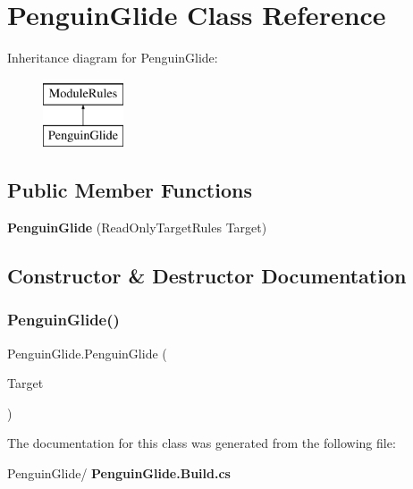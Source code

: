 \section{Penguin\+Glide Class Reference}
\label{class_penguin_glide}
Inheritance diagram for Penguin\+Glide\+:\begin{figure}[H]
\begin{center}
\leavevmode
\includegraphics[height=2.000000cm]{class_penguin_glide}
\end{center}
\end{figure}
\subsection*{Public Member Functions}
\begin{DoxyCompactItemize}
\item 
\textbf{ Penguin\+Glide} (Read\+Only\+Target\+Rules Target)
\end{DoxyCompactItemize}


\subsection{Constructor \& Destructor Documentation}
\mbox{\label{class_penguin_glide_a44f1572327c1e97de8a2cee86e356002}} 
\subsubsection{PenguinGlide()}
{\footnotesize\ttfamily Penguin\+Glide.\+Penguin\+Glide (\begin{DoxyParamCaption}\item[{Read\+Only\+Target\+Rules}]{Target }\end{DoxyParamCaption})\hspace{0.3cm}{\ttfamily [inline]}}



The documentation for this class was generated from the following file\+:\begin{DoxyCompactItemize}
\item 
Penguin\+Glide/\textbf{ Penguin\+Glide.\+Build.\+cs}\end{DoxyCompactItemize}
